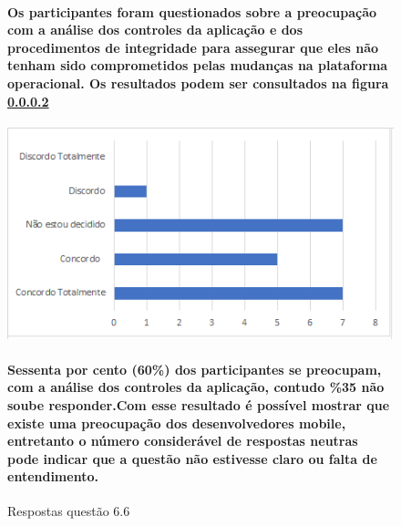 \begin{figure}[!t]
\centering
\paragraph{Os participantes foram questionados sobre a preocupação com a análise dos controles da aplicação e dos procedimentos de integridade para assegurar que eles não tenham sido comprometidos pelas mudanças na plataforma operacional. Os resultados podem ser consultados na figura \ref{fig:6.6}}
\includegraphics[scale=0.7]{figuras das questoes/6.6.png}
\caption{Respostas questão 6.6}
\paragraph{Sessenta por cento (60{\%}) dos participantes se preocupam, com a análise dos controles da aplicação, contudo {\%35} não soube responder.Com esse resultado é possível mostrar que existe uma preocupação dos desenvolvedores mobile, entretanto o número considerável de respostas neutras pode indicar que a questão não estivesse claro ou falta de entendimento.}
\label{fig:6.6}
\end{figure}

